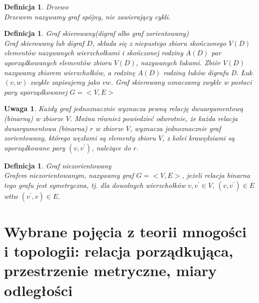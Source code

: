 \documentclass[12pt,a4paper]{report}
\newtheorem{definition}[theorem]{Definicja}
\newtheorem{uwaga}{Uwaga}
\begin{document}

\begin{definition}{Drzewo \cite[Rozdział 4]{wilson2008}\\}
Drzewem nazywamy graf spójny, nie zawierający cykli.\\
\end{definition}

\begin{definition}{Graf skierowany(digraf albo graf zorientowany) \cite[Rozdział 7]{wilson2008}\\}
Graf skierowany lub digraf $D$, składa się z niepustego zbioru skończonego $V(D)$ elementów nazywanych wierzchołkami i skończonej rodziny $A(D)$ par uporządkowanych elementów zbioru $V(D)$, nazywanych łukami. Zbiór $V(D)$ nazywamy zbiorem wierzchołków, a rodzinę $A(D)$ rodziną łuków digrafu D. Łuk $(v,w)$ zwykle zapisujemy jako $vw$. Graf skierowany oznaczamy zwykle w postaci pary uporządkowanej $G=<V,E>$\\
\end{definition}

\begin{uwaga}
Każdy graf jednoznacznie wyznacza pewną relację dwuargumentową (binarną) w zbiorze $V$. Można również powiedzieć odwrotnie, że każda relacja dwuargumentowa (binarna) $r$ w zbiorze $V$, wyznacza jednoznacznie graf zorientowany, którego węzłami są elementy zbioru $V$, z kolei krawędziami są uporządkowane pary $(v,v^{'})$, należące do $r$. 
\end{uwaga}

\begin{definition}{Graf niezorientowany \cite[Rozdział 2.3]{panek2013}\\}
Grafem niezorientowanym, nazywamy graf $G=<V,E>$, jeżeli relacja binarna tego grafu jest symetryczna, tj. dla dowolnych wierzchołków $v,v^{'} \in V$, $(v,v^{'}) \in E$ wttw $(v^{'},v) \in E$.
\end{definition}

\newpage
\section{Wybrane pojęcia z teorii mnogości i topologii: relacja porządkująca, przestrzenie metryczne, miary odległości}
\end{document}
